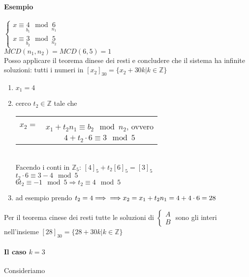     \paragraph{Esempio}
    $
    \begin{cases}
        x\equiv \underset{b_1}{4}\mod \underset{n_1}{6}\\
        x\equiv \underset{b_2}{3}\mod \underset{n_2}{5}
    \end{cases}
    $\\
    $MCD(n_1,n_2)=MCD(6,5)=1$ \\
    Posso applicare il teorema dinese dei resti e concludere che il sistema ha infinite soluzioni: tutti i numeri in $[x_2]_30=\{x_2+30k|k\in\mathbb{Z}\}$
    \begin{enumerate}
        \item $x_1=4$
        \item cerco $t_2\in\mathbb{Z}$ tale che 
            \begin{tabular}{c c}
                & \\
                $x_2=$ & $x_1+t_2n_1\equiv b_2\mod n_2$, ovvero\\
                & $4+t_2\cdot 6\equiv 3\mod 5$
            \end{tabular}\\
            Facendo i conti in $\mathbb{Z}_5$: $[4]_5+t_2[6]_5=[3]_5$\\
            $t_2\cdot 6\equiv 3-4 \mod 5$\\
            $6t_2\equiv -1\mod 5\Longrightarrow t_2\equiv 4\mod 5$
        \item ad esempio prendo $t_2=4\Longrightarrow \\
            \Longrightarrow x_2=x_1+t_2n_1=4+4\cdot 6=28$
    \end{enumerate}
    Per il teorema cinese dei resti tutte le soluzioni di $\begin{cases}A\\B\end{cases}$ 
    sono gli interi nell'insieme 
    $[28]_{30} = \{28+30k|k\in\mathbb{Z}\}$
    \paragraph{Il caso $k=3$} Consideriamo \\

